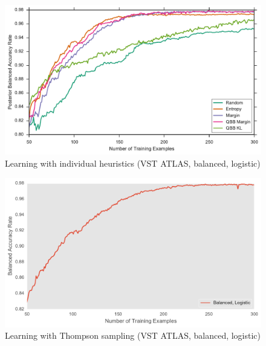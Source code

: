 \begin{figure}[p]
	\centering
	\includegraphics[width=\textwidth]{figures/5_active/vstatlas_ul_individuals}
	\caption[Learning with individual heuristics (VST ATLAS, unbalanced, logistic)]{
		Learning with individual heuristics (VST ATLAS, balanced, logistic)}
	\label{fig:vstatlas_ul_individuals}
\end{figure}

\begin{figure}[p]
	\centering
	\includegraphics[width=\textwidth]{figures/5_thompson/vstatlas_ul_thompson}
	\caption[Learning with Thompson sampling (VST ATLAS, unbalanced, logistic)]{
		Learning with Thompson sampling (VST ATLAS, balanced, logistic)}
	\label{fig:vstatlas_ul_thompson}
\end{figure}

